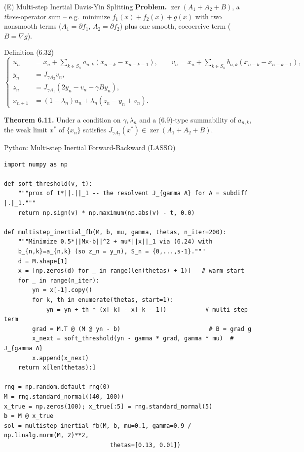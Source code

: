 \documentclass[aspectratio=169,10pt]{beamer}
\newcommand{\zer}{\operatorname{zer}}
\begin{document}
\begin{frame}{(E) Multi-step Inertial Davis-Yin Splitting}
\textbf{Problem.} $\zer(A_1+A_2+B)$, a \emph{three}-operator sum -- e.g.\
minimize $f_1(x)+f_2(x)+g(x)$ with two nonsmooth terms ($A_1=\partial f_1$,
$A_2=\partial f_2$) plus one smooth, cocoercive term ($B=\nabla g$).
\begin{block}{Definition (6.32)}
\[
\left\{
\begin{aligned}
u_n &= x_n + \sum_{k\in S_n} a_{n,k}(x_{n-k}-x_{n-k-1}), \qquad
v_n = x_n + \sum_{k\in S_n} b_{n,k}(x_{n-k}-x_{n-k-1}), \\
y_n &= J_{\gamma A_2}v_n, \\
z_n &= J_{\gamma A_1}(2y_n-v_n-\gamma B y_n), \\
x_{n+1} &= (1-\lambda_n)u_n + \lambda_n(z_n-y_n+v_n).
\end{aligned}
\right.
\]
\end{block}
\textbf{Theorem 6.11.} Under a condition on $\gamma,\lambda_n$ and a
(6.9)-type summability of $a_{n,k}$, the weak limit $x^\ast$ of $\{x_n\}$
satisfies $J_{\gamma A_2}(x^\ast)\in\zer(A_1+A_2+B)$.
\end{frame}

\begin{frame}[fragile]{Python: Multi-step Inertial Forward-Backward (LASSO)}
\begin{lstlisting}
import numpy as np

def soft_threshold(v, t):
    """prox of t*||.||_1 -- the resolvent J_{gamma A} for A = subdiff |.|_1."""
    return np.sign(v) * np.maximum(np.abs(v) - t, 0.0)

def multistep_inertial_fb(M, b, mu, gamma, thetas, n_iter=200):
    """Minimize 0.5*||Mx-b||^2 + mu*||x||_1 via (6.24) with
    b_{n,k}=a_{n,k} (so z_n = y_n), S_n = {0,...,s-1}."""
    d = M.shape[1]
    x = [np.zeros(d) for _ in range(len(thetas) + 1)]   # warm start
    for _ in range(n_iter):
        yn = x[-1].copy()
        for k, th in enumerate(thetas, start=1):
            yn = yn + th * (x[-k] - x[-k - 1])           # multi-step term
        grad = M.T @ (M @ yn - b)                         # B = grad g
        x_next = soft_threshold(yn - gamma * grad, gamma * mu)  # J_{gamma A}
        x.append(x_next)
    return x[len(thetas):]

rng = np.random.default_rng(0)
M = rng.standard_normal((40, 100))
x_true = np.zeros(100); x_true[:5] = rng.standard_normal(5)
b = M @ x_true
sol = multistep_inertial_fb(M, b, mu=0.1, gamma=0.9 / np.linalg.norm(M, 2)**2,
                              thetas=[0.13, 0.01])
\end{lstlisting}
\end{frame}
\end{document}
